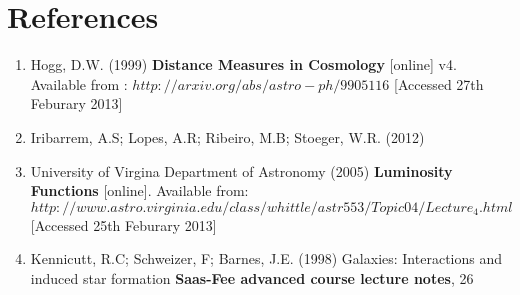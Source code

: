 \documentclass{article}
\begin{document}
\section{References}
\begin{enumerate}
	\item Hogg, D.W. (1999) \textbf{Distance Measures in Cosmology} [online] v4.  Available from : $http://arxiv.org/abs/astro-ph/9905116$ [Accessed 27th Feburary 2013]
	\item Iribarrem, A.S; Lopes, A.R; Ribeiro, M.B; Stoeger, W.R. (2012) 
	\item University of Virgina Department of Astronomy (2005) \textbf{Luminosity Functions} [online]. Available from: $http://www.astro.virginia.edu/class/whittle/astr553/Topic04/Lecture_4.html$ [Accessed 25th Feburary 2013] 
	\item Kennicutt, R.C; Schweizer, F; Barnes, J.E. (1998) Galaxies: Interactions and induced star formation \textbf{Saas-Fee advanced course lecture notes}, 26 
\end{enumerate}   
\end{document}
